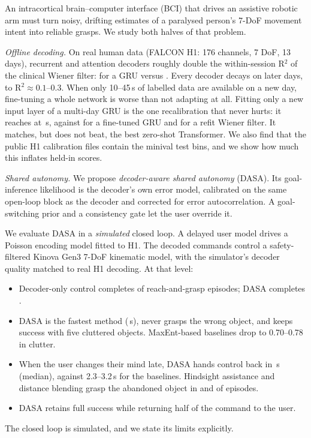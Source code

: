 An intracortical brain--computer interface (BCI) that drives an assistive robotic arm must turn noisy, drifting estimates of a paralysed person's 7-DoF movement intent into reliable grasps. We study both halves of that problem.

\emph{Offline decoding.} On real human data (FALCON H1: 176 channels, 7 DoF, 13 days), recurrent and attention decoders roughly double the within-session R$^2$ of the clinical Wiener filter: \GRUWithin{} for a GRU versus \WienerWithin{}. Every decoder decays on later days, to R$^2\approx0.1$--0.3. When only 10--45\,s of labelled data are available on a new day, fine-tuning a whole network is worse than not adapting at all. Fitting only a new input layer of a multi-day GRU is the one recalibration that never hurts: it reaches \MSGRUFew{} at \RecalMax\,s, against \GRUFew{} for a fine-tuned GRU and \WienerPooledFew{} for a refit Wiener filter. It matches, but does not beat, the best zero-shot Transformer. We also find that the public H1 calibration files contain the minival test bins, and we show how much this inflates held-in scores.

\emph{Shared autonomy.} We propose \emph{decoder-aware shared autonomy} (DASA). Its goal-inference likelihood is the decoder's own error model, calibrated on the same open-loop block as the decoder and corrected for error autocorrelation. A goal-switching prior and a consistency gate let the user override it.

We evaluate DASA in a \emph{simulated} closed loop. A delayed user model drives a Poisson encoding model fitted to H1. The decoded commands control a safety-filtered Kinova Gen3 7-DoF kinematic model, with the simulator's decoder quality matched to real H1 decoding. At that level:
\begin{itemize}
\item Decoder-only control completes \SuccDirect{} of reach-and-grasp episodes; DASA completes \SuccDASA.
\item DASA is the fastest method (\TimeDASA\,s), never grasps the wrong object, and keeps \ClutSuccDASA{} success with five cluttered objects. MaxEnt-based baselines drop to 0.70--0.78 in clutter.
\item When the user changes their mind late, DASA hands control back in \YieldDASA\,s (median), against 2.3--3.2\,s for the baselines. Hindsight assistance and distance blending grasp the abandoned object in \ComWrongHindsight{} and \ComWrongDistance{} of episodes.
\item DASA retains full success while returning half of the command to the user.
\end{itemize}
The closed loop is simulated, and we state its limits explicitly.
